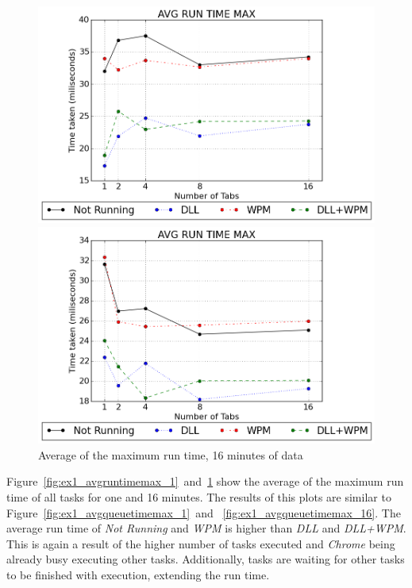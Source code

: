 \begin{figure}[h]
	\centering
    \includegraphics[width=\textwidth,height=0.45\textheight,keepaspectratio]{Evaluation/experiment1/AVG-RUNTIME-MAX-1.png}
    \caption{Average of the maximum run time, 1 minute of data}
    \label{fig:ex1_avgruntimemax_1}
    
  	\vspace*{\floatsep}    
    
    \includegraphics[width=\textwidth,height=0.45\textheight,keepaspectratio]{Evaluation/experiment1/AVG-RUNTIME-MAX-16.png}
    \caption{Average of the maximum run time, 16 minutes of data}
    \label{fig:ex1_avgruntimemax_16}
\end{figure}
Figure~\ref{fig:ex1_avgruntimemax_1}~and~\ref{fig:ex1_avgruntimemax_16} show the average of the maximum run time of all tasks for one and 16 minutes. The results of this plots are similar to Figure~\ref{fig:ex1_avgqueuetimemax_1}~and~ \ref{fig:ex1_avgqueuetimemax_16}. The average run time of \emph{Not Running} and \emph{\gls{WPM}} is higher than \emph{\gls{DLL}} and \emph{\gls{DLL}+\gls{WPM}}. This is again a result of the higher number of tasks executed and \emph{Chrome} being already busy executing other tasks. Additionally, tasks are waiting for other tasks to be finished with execution, extending the run time.
